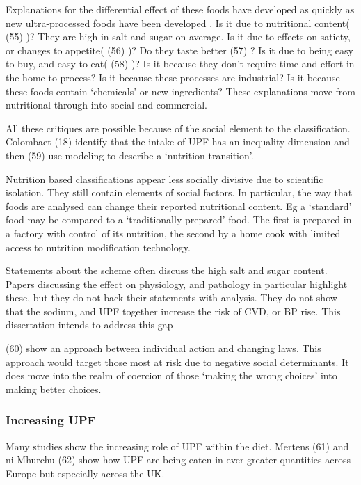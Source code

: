 \documentclass[
]{article}
\begin{document}
Explanations for the differential effect of these foods have developed
as quickly as new ultra-processed foods have been developed . Is it due
to nutritional content( (55) )? They are high in salt and sugar on
average. Is it due to effects on satiety, or changes to appetite( (56)
)? Do they taste better (57) ? Is it due to being easy to buy, and easy
to eat( (58) )? Is it because they don't require time and effort in the
home to process? Is it because these processes are industrial? Is it
because these foods contain `chemicals' or new ingredients? These
explanations move from nutritional through into social and commercial.

All these critiques are possible because of the social element to the
classification. Colombaet (18) identify that the intake of UPF has an
inequality dimension and then (59) use modeling to describe a `nutrition
transition'.

Nutrition based classifications appear less socially divisive due to
scientific isolation. They still contain elements of social factors. In
particular, the way that foods are analysed can change their reported
nutritional content. Eg a `standard' food may be compared to a
`traditionally prepared' food. The first is prepared in a factory with
control of its nutrition, the second by a home cook with limited access
to nutrition modification technology.

Statements about the scheme often discuss the high salt and sugar
content. Papers discussing the effect on physiology, and pathology in
particular highlight these, but they do not back their statements with
analysis. They do not show that the sodium, and UPF together increase
the risk of CVD, or BP rise. This dissertation intends to address this
gap

(60) show an approach between individual action and changing laws. This
approach would target those most at risk due to negative social
determinants. It does move into the realm of coercion of those `making
the wrong choices' into making better choices.

\hypertarget{increasing-upf}{%
\subsubsection{Increasing UPF}\label{increasing-upf}}

Many studies show the increasing role of UPF within the diet. Mertens
(61) and ni Mhurchu (62) show how UPF are being eaten in ever greater
quantities across Europe but especially across the UK.
\end{document}
